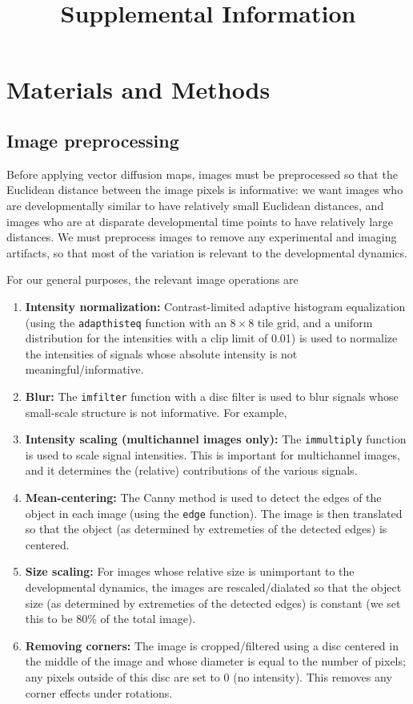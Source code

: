 \documentclass[10pt,twocolumn]{article}
\title{Supplemental Information}
\date{}
\begin{document}
\maketitle


\section*{Materials and Methods}

\subsection*{Image preprocessing}

Before applying vector diffusion maps, images must be preprocessed so that the Euclidean distance between the image pixels is informative: we want images who are developmentally similar to have relatively small Euclidean distances, and images who are at disparate developmental time points to have relatively large distances. 
%
We must preprocess images to remove any experimental and imaging artifacts, so that most of the variation is relevant to the developmental dynamics. 

For our general purposes, the relevant image operations are 
\begin{enumerate}
\item {\bf Intensity normalization:} Contrast-limited adaptive histogram equalization (using the \texttt{adapthisteq} function with an $8 \times 8$ tile grid, and a uniform distribution for the intensities with a clip limit of 0.01) is used to normalize the intensities of signals whose absolute intensity is not meaningful/informative.
%
\item {\bf Blur:} The \texttt{imfilter} function with a disc filter is used to blur signals whose small-scale structure is not informative. For example, 
%
\item {\bf Intensity scaling (multichannel images only):} The \texttt{immultiply} function is used to scale signal intensities. This is important for multichannel images, and it determines the (relative) contributions of the various signals.  
%
\item {\bf Mean-centering:}  The Canny method \citep{canny1986computational} is used to detect the edges of the object in each image (using the \texttt{edge} function). The image is then translated so that the object (as determined by extremeties of the detected edges) is centered.
%
\item {\bf Size scaling:} For images whose relative size is unimportant to the developmental dynamics, the images are rescaled/dialated so that the object size (as determined by extremeties of the detected edges) is constant (we set this to be 80\% of the total image).
%
\item {\bf Removing corners:} The image is cropped/filtered using a disc centered in the middle of the image and whose diameter is equal to the number of pixels; any pixels outside of this disc are set to 0 (no intensity). This removes any corner effects under rotations. 
\end{enumerate}
\end{document}
